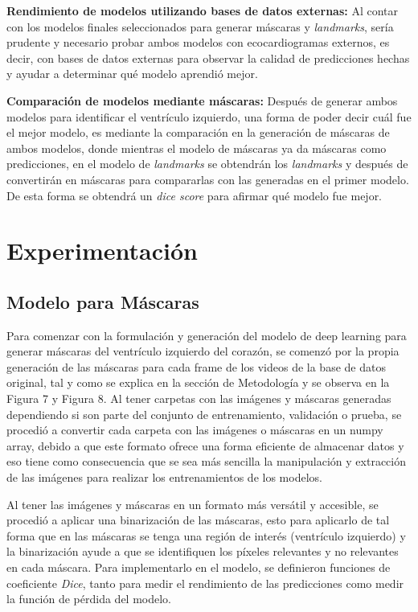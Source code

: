 \documentclass[runningheads]{llncs}
\begin{document}
\textbf{Rendimiento de modelos utilizando bases de datos externas: } Al contar con los modelos finales seleccionados para generar máscaras y \textit{landmarks}, sería prudente y necesario probar ambos modelos con ecocardiogramas externos, es decir, con bases de datos externas para observar la calidad de predicciones hechas y ayudar a determinar qué modelo aprendió mejor.

\textbf{Comparación de modelos mediante máscaras:} Después de generar ambos modelos para identificar el ventrículo izquierdo, una forma de poder decir cuál fue el mejor modelo, es mediante la comparación en la generación de máscaras de ambos modelos, donde mientras el modelo de máscaras ya da máscaras como predicciones, en el modelo de \textit{landmarks} se obtendrán los \textit{landmarks} y después de convertirán en máscaras para compararlas con las generadas en el primer modelo. De esta forma se obtendrá un \textit{dice score} para afirmar qué modelo fue mejor.




\section{Experimentación}

\subsection{Modelo para Máscaras}

Para comenzar con la formulación y generación del modelo de deep learning para generar máscaras del ventrículo izquierdo del corazón, se comenzó por la propia generación de las máscaras para cada frame de los videos de la base de datos original, tal y como se explica en la sección de Metodología y se observa en la Figura 7 y Figura 8. Al tener carpetas con las imágenes y máscaras generadas dependiendo si son parte del conjunto de entrenamiento, validación o prueba, se procedió a convertir cada carpeta con las imágenes o máscaras en un numpy array, debido a que este formato ofrece una forma eficiente de almacenar datos y eso tiene como consecuencia que se sea más sencilla la manipulación y extracción de las imágenes para realizar los entrenamientos de los modelos.

Al tener las imágenes y máscaras en un formato más versátil y accesible, se procedió a aplicar una binarización de las máscaras, esto para aplicarlo de tal forma que en las máscaras se tenga una región de interés (ventrículo izquierdo) y la binarización ayude a que se identifiquen los píxeles relevantes y no relevantes en cada máscara.
Para implementarlo en el modelo, se definieron funciones de coeficiente \textit{Dice}, tanto para medir el rendimiento de las predicciones como medir la función de pérdida del modelo.
\end{document}
